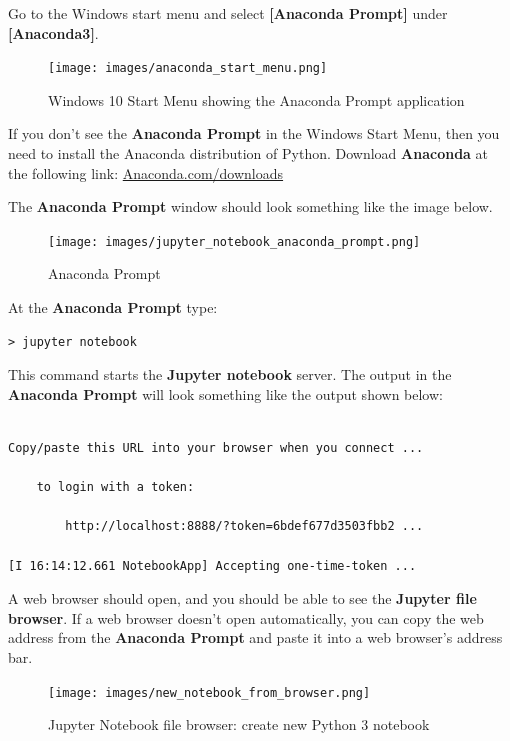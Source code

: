 \documentclass{book}
\begin{document}
Go to the Windows start menu and select \textbf{{[}Anaconda Prompt{]}}
under \textbf{{[}Anaconda3{]}}.

\begin{figure}
\centering
\texttt{[image: images/anaconda\_start\_menu.png]}
\caption{Windows 10 Start Menu showing the Anaconda Prompt application}
\end{figure}

If you don't see the \textbf{Anaconda Prompt} in the Windows Start Menu,
then you need to install the Anaconda distribution of Python. Download
\textbf{Anaconda} at the following link:
\href{https://www.anaconda.com/download/}{Anaconda.com/downloads}

The \textbf{Anaconda Prompt} window should look something like the image
below.

\begin{figure}
\centering
\texttt{[image: images/jupyter\_notebook\_anaconda\_prompt.png]}
\caption{Anaconda Prompt}
\end{figure}

At the \textbf{Anaconda Prompt} type:

\begin{lstlisting}
> jupyter notebook
\end{lstlisting}

This command starts the \textbf{Jupyter notebook} server. The output in
the \textbf{Anaconda Prompt} will look something like the output shown
below:

\begin{lstlisting}

Copy/paste this URL into your browser when you connect ...

    to login with a token:

        http://localhost:8888/?token=6bdef677d3503fbb2 ...

[I 16:14:12.661 NotebookApp] Accepting one-time-token ...
\end{lstlisting}

A web browser should open, and you should be able to see the
\textbf{Jupyter file browser}. If a web browser doesn't open
automatically, you can copy the web address from the \textbf{Anaconda
Prompt} and paste it into a web browser's address bar.

\begin{figure}
\centering
\texttt{[image: images/new\_notebook\_from\_browser.png]}
\caption{Jupyter Notebook file browser: create new Python 3 notebook}
\end{figure}
\end{document}
